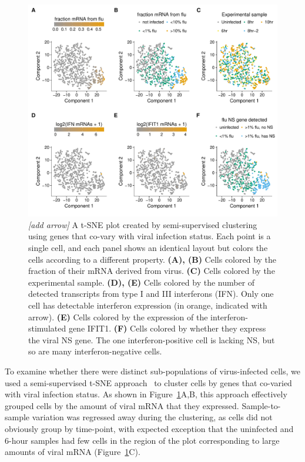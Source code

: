 \documentclass[9pt,lineno]{elife}
\newcommand{\jdbcomment}[1]{\emph{\color{red} [#1]}}
\begin{document}
\begin{figure}
\centerline{\includegraphics[width=0.9\linewidth]{figures/p_small_tsne_merge.pdf}}
\caption{\label{fig:tsne}
\jdbcomment{add arrow}
A t-SNE plot created by semi-supervised clustering using genes that co-vary with viral infection status.
Each point is a single cell, and each panel shows an identical layout but colors the cells according to a different property.
{\bf (A), (B)}
Cells colored by the fraction of their mRNA derived from virus.
{\bf (C)}
Cells colored by the experimental sample.
{\bf (D), (E)}
Cells colored by the number of detected transcripts from type I and III interferons (IFN).
Only one cell has detectable interferon expression (in orange, indicated with arrow).
{\bf (E)}
Cells colored by the expression of the interferon-stimulated gene IFIT1.
{\bf (F)}
Cells colored by whether they express the viral NS gene.
The one interferon-positive cell is lacking NS, but so are many interferon-negative cells.
}
\end{figure}

To examine whether there were distinct sub-populations of virus-infected cells, we used a semi-supervised t-SNE approach~\citep{VanderMaaten:2008tm} to cluster cells by genes that co-varied with viral infection status.
As shown in Figure~\ref{fig:tsne}A,B, this approach effectively grouped cells by the amount of viral mRNA that they expressed.
Sample-to-sample variation was regressed away during the clustering, as cells did not obviously group by time-point, with expected exception that the uninfected and 6-hour samples had few cells in the region of the plot corresponding to large amounts of viral mRNA (Figure~\ref{fig:tsne}C).
\end{document}
